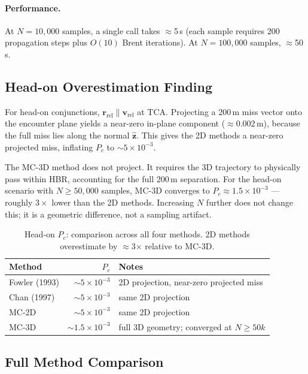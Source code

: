 \documentclass[11pt]{article}
\begin{document}
\paragraph{Performance.}
At $N = 10{,}000$ samples, a single call takes $\approx$5\,s (each sample
requires 200 propagation steps plus $O(10)$ Brent iterations).  At
$N = 100{,}000$ samples, $\approx$50\,s.

\subsection{Head-on Overestimation Finding}
\label{sec:headon_overestimation}

For head-on conjunctions, $\mathbf{r}_\text{rel} \parallel \mathbf{v}_\text{rel}$
at TCA.  Projecting a 200\,m miss vector onto the encounter plane yields
a near-zero in-plane component ($\approx$0.002\,m), because the full miss lies
along the normal $\hat{\mathbf{z}}$.  This gives the 2D methods a near-zero
projected miss, inflating $P_c$ to $\sim5\times10^{-3}$.

The MC-3D method does not project.  It requires the 3D trajectory to physically
pass within HBR, accounting for the full 200\,m separation.  For the head-on
scenario with $N \ge 50{,}000$ samples, MC-3D converges to
$P_c \approx 1.5\times10^{-3}$ — roughly $3\times$ lower than the 2D methods.
Increasing $N$ further does not change this; it is a geometric difference, not
a sampling artifact.

\begin{table}[htb]
\centering
\caption{Head-on $P_c$: comparison across all four methods.
         2D methods overestimate by $\approx$3$\times$ relative to MC-3D.}
\label{tab:headon_overestimation}
\begin{tabular}{lrl}
  \toprule
  Method & $P_c$ & Notes \\
  \midrule
  Fowler (1993) & $\sim 5\times10^{-3}$ & 2D projection, near-zero projected miss \\
  Chan (1997)   & $\sim 5\times10^{-3}$ & same 2D projection \\
  MC-2D         & $\sim 5\times10^{-3}$ & same 2D projection \\
  MC-3D         & $\sim 1.5\times10^{-3}$ & full 3D geometry; converged at $N \ge 50k$ \\
  \bottomrule
\end{tabular}
\end{table}

\subsection{Full Method Comparison}
\label{sec:method_comparison}
\end{document}
